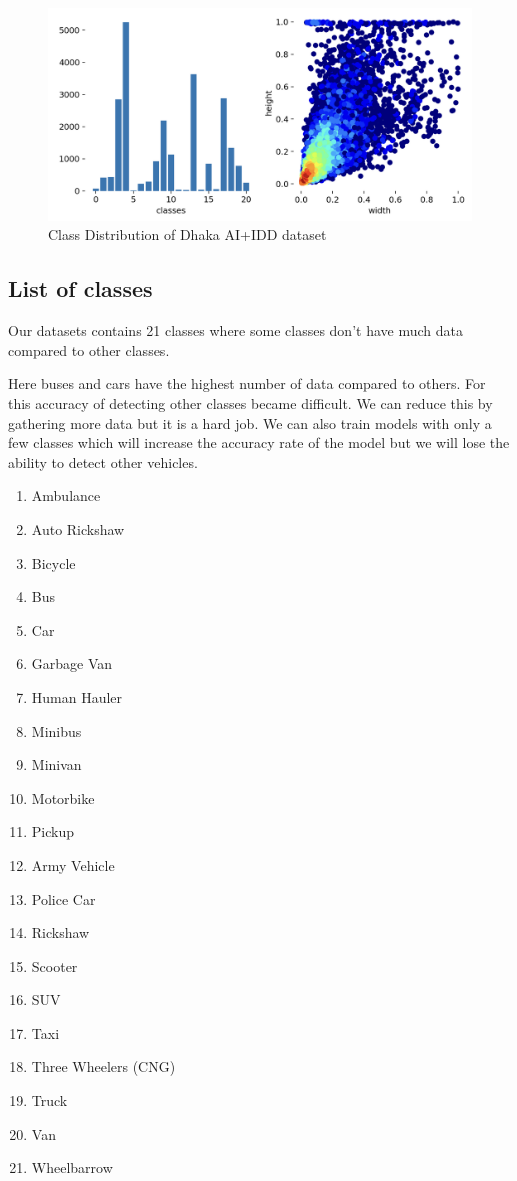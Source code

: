 \begin{figure}[ht]
    \centering
    \includegraphics[max width=\textwidth]{images/ours/dhaka-ai+idd.png}
   \caption[Class Distribution of Dhaka AI+IDD dataset]{Class Distribution of Dhaka AI+IDD dataset}
    \label{fig:dhakaai_dataset}
\end{figure}

\subsection{List of classes}
Our datasets contains 21 classes where some classes don't have much data compared to other classes. 

Here buses and cars have the highest number of data compared to others. For this accuracy of detecting other classes became difficult. We can reduce this by gathering more data but it is a hard job. We can also train models with only a few classes which will increase the accuracy rate of the model but we will lose the ability to detect other vehicles.


\begin{multicols}{2}
\begin{enumerate}
\item Ambulance
\item Auto Rickshaw
\item Bicycle
\item Bus
\item Car
\item Garbage Van
\item Human Hauler
\item Minibus
\item Minivan
\item Motorbike
\item Pickup
\item Army Vehicle
\item Police Car
\item Rickshaw
\item Scooter
\item SUV
\item Taxi
\item Three Wheelers (CNG)
\item Truck
\item Van
\item Wheelbarrow
\end{enumerate}
\end{multicols}


